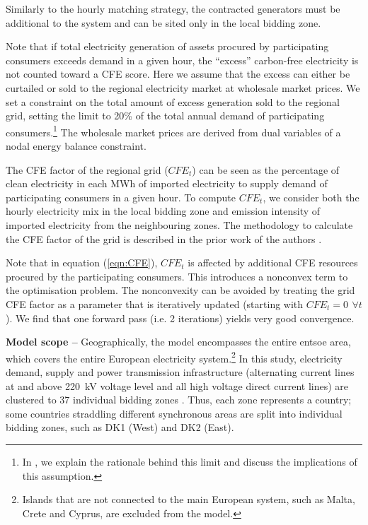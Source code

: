 \documentclass[11pt, 5p, nopreprintline]{elsarticle}
\begin{document}
Similarly to the hourly matching strategy, the contracted generators must be additional to the system and can be sited only in the local bidding zone.

Note that if total electricity generation of assets procured by participating consumers exceeds demand in a given hour, the \enquote{excess} carbon-free electricity is not counted toward a CFE score.
Here we assume that the excess can either be curtailed or sold to the regional electricity market at wholesale market prices.
We set a constraint on the total amount of excess generation sold to the regional grid, setting the limit to 20\% of the total annual demand of participating consumers.\footnote{In , we explain the rationale behind this limit and discuss the implications of this assumption.}
The wholesale market prices are derived from dual variables of a nodal energy balance constraint.

The CFE factor of the regional grid ($CFE_t$) can be seen as the percentage of clean electricity in each MWh of imported electricity to supply demand of participating consumers in a given hour.
To compute $CFE_t$, we consider both the hourly electricity mix in the local bidding zone and emission intensity of imported electricity from the neighbouring zones.
The methodology to calculate the CFE factor of the grid is described in the prior work of the authors \cite{riepin-zenodo-systemlevel247}.

Note that in equation (\ref{eqn:CFE}), $CFE_t$ is affected by additional CFE resources procured by the participating consumers.
This introduces a nonconvex term to the optimisation problem.
The nonconvexity can be avoided by treating the grid CFE factor as a parameter that is iteratively updated (starting with $CFE_t =0 \,~\forall t$).
We find that one forward pass (i.e. 2 iterations) yields very good convergence.


\textbf{Model scope --} Geographically, the model encompasses the entire \gls{entsoe} area, which covers the entire European electricity system.\footnote{Islands that are not connected to the main European system, such as Malta, Crete and Cyprus, are excluded from the model.}
In this study, electricity demand, supply and power transmission infrastructure (alternating current lines at and above 220~kV voltage level and all high voltage direct current lines) are clustered to 37 individual bidding zones \cite{PyPSAEur-docs}.
Thus, each zone represents a country; some countries straddling different synchronous areas are split into individual bidding zones, such as DK1 (West) and DK2 (East).
\end{document}
